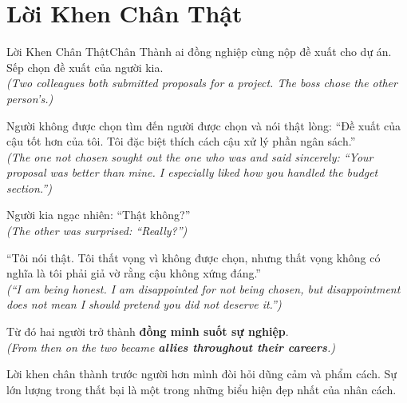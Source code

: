 \section{Lời Khen Chân Thật}
\begin{truyen}{Lời Khen Chân Thật}{Chân Thành}
ai đồng nghiệp cùng nộp đề xuất cho dự án. Sếp chọn đề xuất của người kia.\\
\textit{(Two colleagues both submitted proposals for a project. The boss chose the other person's.)}

Người không được chọn tìm đến người được chọn và nói thật lòng: ``Đề xuất của cậu tốt hơn của tôi. Tôi đặc biệt thích cách cậu xử lý phần ngân sách.''\\
\textit{(The one not chosen sought out the one who was and said sincerely: ``Your proposal was better than mine. I especially liked how you handled the budget section.'')}

Người kia ngạc nhiên: ``Thật không?''\\
\textit{(The other was surprised: ``Really?'')}

``Tôi nói thật. Tôi thất vọng vì không được chọn, nhưng thất vọng không có nghĩa là tôi phải giả vờ rằng cậu không xứng đáng.''\\
\textit{(``I am being honest. I am disappointed for not being chosen, but disappointment does not mean I should pretend you did not deserve it.'')}

Từ đó hai người trở thành \textbf{đồng minh suốt sự nghiệp}.\\
\textit{(From then on the two became \textbf{allies throughout their careers}.)}
\end{truyen}
\begin{baihoc}
  Lời khen chân thành trước người hơn mình đòi hỏi dũng cảm và phẩm cách. Sự lớn lượng trong thất bại là một trong những biểu hiện đẹp nhất của nhân cách.
\end{baihoc}

